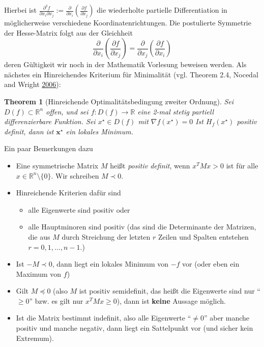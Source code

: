 \documentclass[]{book}
\providecommand{\tightlist}{%
  \setlength{\itemsep}{0pt}\setlength{\parskip}{0pt}}
\newtheorem{theorem}{Theorem}[chapter]
\theoremstyle{definition}
\theoremstyle{definition}
\theoremstyle{definition}
\theoremstyle{definition}
\theoremstyle{remark}
\begin{document}
Hierbei ist \(\frac{\partial^{2} f}{\partial x_{i} \partial x_{j}}:=\frac{\partial }{\partial x_{i}}(\frac{\partial f}{\partial x_{j}})\) die wiederholte partielle Differentiation in möglicherweise verschiedene Koordinatenrichtungen. Die postulierte Symmetrie der Hesse-Matrix folgt aus der Gleichheit
\begin{equation*}
\frac{\partial }{\partial x_{i}}(\frac{\partial f}{\partial x_{j}})
=
\frac{\partial }{\partial x_{j}}(\frac{\partial f}{\partial x_{i}})
\end{equation*}
deren Gültigkeit wir noch in der Mathematik Vorlesung beweisen werden. Als nächstes ein Hinreichendes Kriterium für Minimalität (vgl. Theorem 2.4, Nocedal and Wright \protect\hyperlink{ref-NocW06}{2006}):

\begin{theorem}[Hinreichende Optimalitätsbedingung zweiter Ordnung]
Sei \(D(f) \subset \mathbb{R}^{n}\) offen, und sei \(f\colon D(f) \rightarrow \mathbb{R}\) eine 2-mal stetig partiell differenzierbare Funktion. Sei \(x^{\star} \in D(f)\) mit \(\nabla f ({x}^{\star})={0}\)
Ist \(H_{f}({x}^{\star})\) positiv definit, dann ist \(\mathbf{x}^{\star}\) ein lokales Minimum.
\end{theorem}

Ein paar Bemerkungen dazu

\begin{itemize}
\item
  Eine symmetrische Matrix \(M\) heißt \emph{positiv definit}, wenn \(x^TMx>0\) ist für alle \(x\in \mathbb R^{n}\setminus \{0\}\). Wir schreiben \(M \prec 0\).
\item
  Hinreichende Kriterien dafür sind

  \begin{itemize}
  \tightlist
  \item
    alle Eigenwerte sind positiv oder
  \item
    alle Hauptminoren sind positiv (das sind die Determinante der Matrizen, die aus \(M\) durch Streichung der letzten \(r\) Zeilen und Spalten entstehen \(r=0,1,\dotsc, n-1\).)
  \end{itemize}
\item
  Ist \(-M \prec 0\), dann liegt ein lokales Minimum von \(-f\) vor (oder eben ein Maximum von \(f\))
\item
  Gilt \(M \preccurlyeq 0\) (also \(M\) ist positiv semidefinit, das heißt die Eigenwerte sind nur ``\(\geq 0\)'' bzw. es gilt nur \(x^TMx\geq 0\)), dann ist \textbf{keine} Aussage möglich.
\item
  Ist die Matrix bestimmt indefinit, also alle Eigenwerte ``\(\neq 0\)'' aber manche positiv und manche negativ, dann liegt ein Sattelpunkt vor (und sicher kein Extremum).
\end{itemize}
\end{document}
